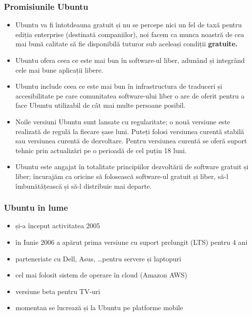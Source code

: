 \documentclass[compress]{beamer}
\begin{document}
\begin{frame}
\frametitle{Promisiunile Ubuntu}

\small
\begin{itemize}[<+->]
  \item Ubuntu va fi întotdeauna gratuit și nu se percepe nici un fel de taxă pentru ediția enterprise (destinată companiilor), noi facem ca munca noastră de cea mai bună calitate să fie disponibilă tuturor sub aceleași condiții \bf gratuite.
  \item Ubuntu ofera ceea ce este mai bun în software-ul liber, adunând și integrând
  cele mai bune aplicații libere.
  \item Ubuntu include ceea ce este mai bun în infrastructura de traduceri și accesibilitate pe care comunitatea software-ului liber o are de oferit pentru a face Ubuntu utilizabil de cât mai multe persoane posibil.
  \item Noile versiuni Ubuntu sunt lansate cu regularitate; o nouă versiune este realizată de regulă la fiecare șase luni. Puteți folosi versiunea curentă stabilă sau versiunea curentă de dezvoltare. Pentru versiunea curentă se oferă suport tehnic prin actualizări pe o perioadă de cel puțin 18 luni.
  \item Ubuntu este angajat în totalitate principiilor dezvoltării de software gratuit și liber; încurajăm ca oricine să folosească software-ul gratuit și liber, să-l îmbunătățească și să-l distribuie mai departe.
\end{itemize}
\end{frame}

\begin{frame}
\frametitle{Ubuntu în lume}

\begin{itemize}[<+->]
  \item și-a început activitatea 2005
  \item în Iunie 2006 a apărut prima versiune cu suport prelungit (LTS) pentru 4 ani
  \item parteneriate cu Dell, Asus, \ldots pentru servere și laptopuri
  \item cel mai folosit sistem de operare în cloud (Amazon AWS)
  \item versiune beta pentru TV-uri
  \item momentan se lucrează și la Ubuntu pe platforme mobile
\end{itemize}

\end{frame}
\end{document}

